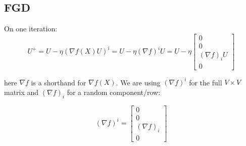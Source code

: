 \documentclass[letterpaper]{article} %
\begin{document}
\subsection{FGD}
On one iteration:
$$U^+=U-\eta (\nabla f(X)U)^i= U-\eta (\nabla f)^iU=U-\eta\begin{bmatrix}
    0 \\
    0 \\
	(\nabla f)_iU\\    
    0 
\end{bmatrix}$$

here $\nabla f$ is a shorthand for $\nabla f(X)$. We are using $(\nabla f)^i$ for the full $V\times V$ matrix and $(\nabla f)_i$ for a random component/row:

$$(\nabla f)^i=\begin{bmatrix}
0 \\
0 \\
(\nabla f)_i\\    
0 
\end{bmatrix}$$
\end{document}
